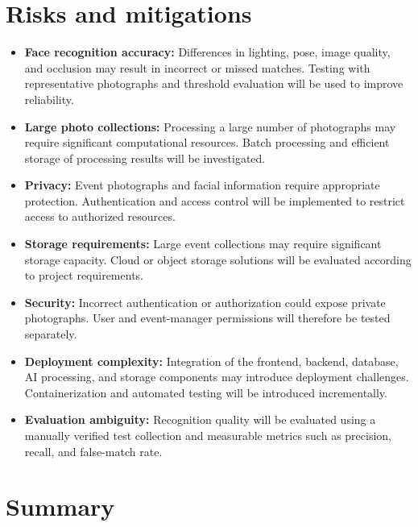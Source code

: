 \documentclass[11pt,a4paper]{article}
\begin{document}
\section{Risks and mitigations}

\begin{itemize}[leftmargin=0.7cm]

    \item \textbf{Face recognition accuracy:} Differences in lighting,
    pose, image quality, and occlusion may result in incorrect or
    missed matches. Testing with representative photographs and
    threshold evaluation will be used to improve reliability.

    \item \textbf{Large photo collections:} Processing a large number
    of photographs may require significant computational resources.
    Batch processing and efficient storage of processing results will
    be investigated.

    \item \textbf{Privacy:} Event photographs and facial information
    require appropriate protection. Authentication and access control
    will be implemented to restrict access to authorized resources.

    \item \textbf{Storage requirements:} Large event collections may
    require significant storage capacity. Cloud or object storage
    solutions will be evaluated according to project requirements.

    \item \textbf{Security:} Incorrect authentication or authorization
    could expose private photographs. User and event-manager
    permissions will therefore be tested separately.

    \item \textbf{Deployment complexity:} Integration of the
    frontend, backend, database, AI processing, and storage components
    may introduce deployment challenges. Containerization and
    automated testing will be introduced incrementally.

    \item \textbf{Evaluation ambiguity:} Recognition quality will be
    evaluated using a manually verified test collection and measurable
    metrics such as precision, recall, and false-match rate.

\end{itemize}

\section{Summary}
\end{document}
